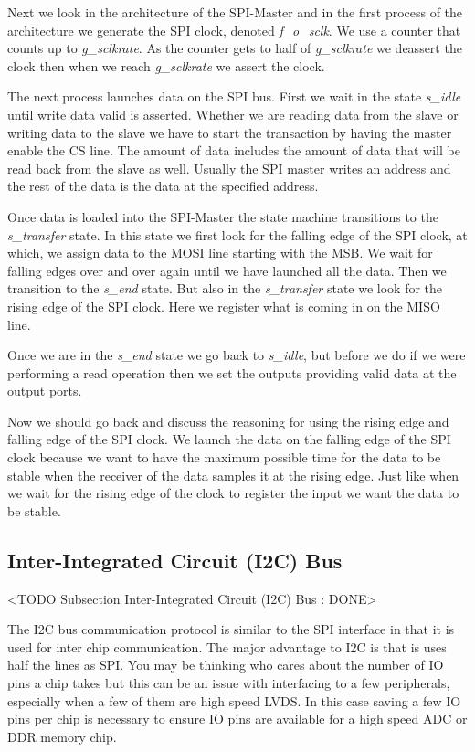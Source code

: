 Next we look in the architecture of the \ac{SPI}-Master and in the first process of the architecture we generate the \ac{SPI} clock, denoted \emph{f\_o\_sclk}. We use a counter that counts up to \emph{g\_sclkrate}. As the counter gets to half of \emph{g\_sclkrate} we deassert the clock then when we reach \emph{g\_sclkrate} we assert the clock. 

The next process launches data on the \ac{SPI} bus. First we wait in the state \emph{s\_idle} until write data valid is asserted. Whether we are reading data from the slave or writing data to the slave we have to start the transaction by having the master enable the \ac{CS} line. The amount of data includes the amount of data that will be read back from the slave as well. Usually the \ac{SPI} master writes an address and the rest of the data is the data at the specified address.

Once data is loaded into the \ac{SPI}-Master the state machine transitions to the \emph{s\_transfer} state. In this state we first look for the falling edge of the \ac{SPI} clock, at which, we assign data to the \ac{MOSI} line starting with the \ac{MSB}. We wait for falling edges over and over again until we have launched all the data. Then we transition to the \emph{s\_end} state. But also in the \emph{s\_transfer} state we look for the rising edge of the \ac{SPI} clock. Here we register what is coming in on the \ac{MISO} line. 

Once we are in the \emph{s\_end} state we go back to \emph{s\_idle}, but before we do if we were performing a read operation then we set the outputs providing valid data at the output ports. 

Now we should go back and discuss the reasoning for using the rising edge and falling edge of the \ac{SPI} clock. We launch the data on the falling edge of the \ac{SPI} clock because we want to have the maximum possible time for the data to be stable when the receiver of the data samples it at the rising edge. Just like when we wait for the rising edge of the clock to register the input we want the data to be stable. 

\subsection{Inter-Integrated Circuit (I2C) Bus}
	<TODO Subsection Inter-Integrated Circuit (I2C) Bus : DONE>

The \ac{I2C} bus communication protocol is similar to the \ac{SPI} interface in that it is used for inter chip communication. The major advantage to \ac{I2C} is that is uses half the lines as \ac{SPI}. You may be thinking who cares about the number of \ac{IO} pins a chip takes but this can be an issue with interfacing to a few peripherals, especially when a few of them are high speed \ac{LVDS}. In this case saving a few \ac{IO} pins per chip is necessary to ensure \ac{IO} pins are available for a high speed \ac{ADC} or \ac{DDR} memory chip. 	
	
